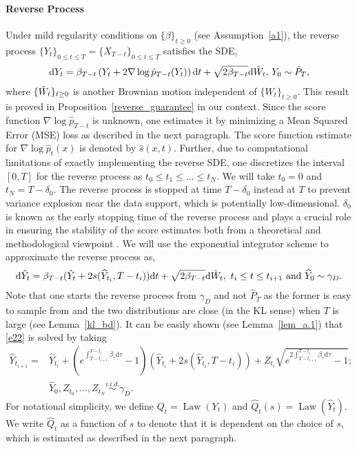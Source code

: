 \documentclass[12pts]{article}
\newcommand{\diff}{\mathrm{d}}
\newcommand{\hP}{ \hat{P}}
\newcommand{\hQ}{ \hat{Q}}
\newcommand{\hX}{ \widehat{X}}
\newcommand{\hY}{ \widehat{Y}}
\newcommand{\hp}{\hat{p}}
\begin{document}
\paragraph{Reverse Process}
Under mild regularity conditions on $\{\beta\}_{t\ge 0}$ (see Assumption~\ref{a1}), the reverse process $\{Y_t\}_{0 \le t \le T} = \{\hX_{T-t}\}_{0 \le t \le T}$ satisfies the SDE,
\begin{align}
    \diff  Y_t = \beta_{T-t} \left( Y_t + 2 \nabla \log \hp_{T-t}(Y_t)\right) \diff  t + \sqrt{2 \beta_{T-t}} \diff  \Tilde{W}_t, \, Y_0 \sim \hP_T, \label{eq_rp}
\end{align}
where $\{\Tilde{W}_t\}_{t \ge 0}$ is another Brownian motion independent of $\{W_t\}_{t \ge 0}$. This result is proved in Proposition~\ref{reverse_guarantee} in our context.  Since the score function $\nabla \log \hat{p}_{T-t}$ is unknown, one estimates it by minimizing a Mean Squared Error (MSE) loss as described in the next paragraph. The score function estimate for $\nabla \log \hat{p}_t(x)$ is denoted by $\hat{s}(x,t)$. Further, due to computational limitations of exactly implementing the reverse SDE, one discretizes the interval $[0,T]$ for the reverse process as $ t_0 \le t_1 \le \dots \le t_N$. We will take $t_0 = 0$ and $t_N = T-\delta_0$. The reverse process is stopped at time $T-\delta_0$ instead at $T$ to prevent variance explosion near the data support, which is potentially low-dimensional. $\delta_0$ is known as the early stopping time of the reverse process and plays a crucial role in ensuring the stability of the score estimates both from a theoretical \citep{debortoli2022convergence,benton2024nearly,pmlr-v238-tang24a} and methodological viewpoint \citep{songscore,lai2025principlesdiffusionmodels}. We will use the exponential integrator scheme to approximate the reverse process as,
\begin{align}
    \diff  \hat{Y}_t = \beta_{T-t} (\hat{Y}_t + 2 s(\hY_{t_i}, T-t_i)) \diff  t + \sqrt{2 \beta_{T-t}} \diff  \Tilde{W}_t, \ t_i \le t \le t_{i+1} \text{ and } \hY_0 \sim \gamma_D. \label{e22}
\end{align}
Note that one starts the reverse process from $\gamma_D$ and not $\hat{P}_T$ as the former is easy to sample from and the two distributions are close (in the KL sense) when $T$ is large (see Lemma~\ref{kl_bd}). It can be easily shown (see Lemma~\ref{lem_a.1}) that \eqref{e22} is solved by taking
\begin{align}
    \hY_{t_{i+1}} = & \hY_{t_i} + \left(e^{\int_{T-t_{i+1}}^{T-t_i} \beta_\tau \diff  \tau} - 1\right)\left(\hY_{t_i} + 2 s(\hY_{t_i}, T-t_i)\right) + Z_{t_i} \sqrt{e^{2\int_{T-t_{i+1}}^{T-t_i} \beta_\tau \diff  \tau} - 1} ; \nonumber\\
    & \hY_0, Z_{t_0}, \dots, Z_{t_N} \overset{i.i.d.}{\sim} \gamma_D. \label{eq_ito}
\end{align}
For notational simplicity, we define $Q_t = \operatorname{Law}(Y_t)$ and $\hQ_t(s) = \operatorname{Law}(\hY_t)$. We write $\hQ_t$ as a function of $s$ to denote that it is dependent on the choice of $s$, which is estimated as described in the next paragraph. 
\end{document}
